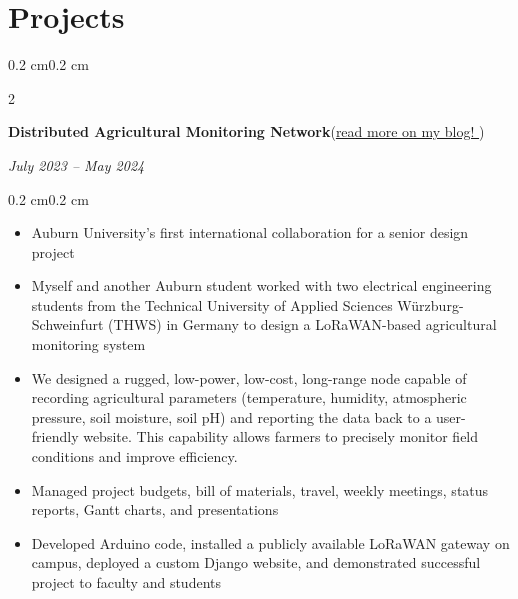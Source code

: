 \documentclass[10pt, letterpaper]{article}
\newenvironment{highlights}{
    \begin{itemize}[topsep=0.10 cm,parsep=0.10 cm,partopsep=0pt,itemsep=0pt,leftmargin=0.4 cm + 10pt]
}{
    \end{itemize}
}
\newenvironment{onecolentry}{
    \begin{adjustwidth}{0.2 cm}{0.2 cm}
}{
    \end{adjustwidth}
}
\newenvironment{twocolentry}[2][]{
    \onecolentry
    \def\secondColumn{#2}
    \setcolumnwidth{\fill, 4.5 cm}
    \begin{paracol}{2}
}{
    \switchcolumn \raggedleft \secondColumn
    \end{paracol}
    \endonecolentry
}
\let\hrefWithoutArrow\href
\renewcommand{\href}[2]{\hrefWithoutArrow{#1}{#2 \raisebox{.15ex}{\footnotesize \faExternalLink*}}}
\begin{document}
    \section{Projects}
        \begin{twocolentry}{\textit{July 2023 – May 2024}}
            \textbf{Distributed Agricultural Monitoring Network}(\href{https://elijahparker000.com/blog/2024/DNAM-Conclusion/}{read more on my blog!})
        \end{twocolentry}
        \vspace{0.10 cm}
        \begin{onecolentry}
            \begin{highlights}
                \item Auburn University's first international collaboration for a senior design project
                \item Myself and another Auburn student worked with two electrical engineering students from the Technical University of Applied Sciences Würzburg-Schweinfurt (THWS) in Germany to design a LoRaWAN-based agricultural monitoring system
                \item We designed a rugged, low-power, low-cost, long-range node capable of recording agricultural parameters (temperature, humidity, atmospheric pressure, soil moisture, soil pH) and reporting the data back to a user-friendly website. This capability allows farmers to precisely monitor field conditions and improve efficiency. 
                \item Managed project budgets, bill of materials, travel, weekly meetings, status reports, Gantt charts, and presentations
                \item Developed Arduino code, installed a publicly available LoRaWAN gateway on campus, deployed a custom Django website, and demonstrated successful project to faculty and students
            \end{highlights}
        \end{onecolentry}

        \vspace{0.2 cm}
\end{document}

